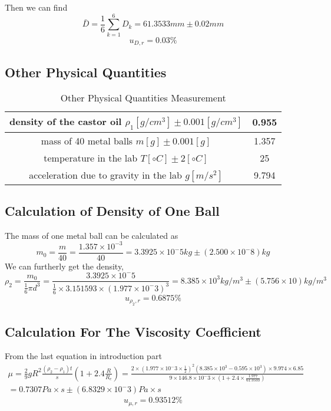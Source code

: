 Then we can find
$$  \bar{D} = \frac{1}{6} \sum_{k=1}^{6} D_k =  61.3533 mm \pm  0.02 mm   $$
$$  u_{D,r} =   0.03\%  $$ 


\subsection{Other Physical Quantities}

\begin{table}[H]
  \centering
  \begin{tabular}{|c|c|}
    \hline
    density of the castor oil $ \rho_1 [g/cm^3] \pm 0.001 [g/cm^3] $ & 0.955  \\ \hline 
    mass of 40 metal balls $ m  [g] \pm 0.001 [g] $ & 1.357 \\ \hline
    temperature in the lab $ T  [\circ C] \pm 2 [\circ C] $ & 25 \\ \hline
    acceleration due to gravity in the lab $ g [m/s^2] $ & 9.794 \\ \hline
  \end{tabular}
  \caption{Other Physical Quantities Measurement}
\end{table}

\subsection{Calculation of Density of One Ball}

The mass of one  metal ball can be calculated as
$$  m_0 = \frac{m}{40} = \frac{1.357 \times 10^{-3} }{40} = 3.3925 \times 10^-5 kg
\pm (2.500 \times 10^-8) kg $$ 
We can furtherly get the density,
$$ \rho_2 = \frac{m_0}{\frac{1}{6} \pi d^3} = \frac{3.3925 \times 10^-5
}{\frac{1}{6} \times 3.151593 \times (1.977 \times 10^-3)^3 } = 8.385 \times
10^3 kg/m^3 \pm (5.756 \times 10  ) kg/m^3  $$
$$  u_{\rho_2,r} =   0.6875\%  $$ 

\subsection{Calculation For The Viscosity Coefficient}
From the last equation in introduction part
\begin{multline*}
\mu = \frac{2}{9} g R^2 \frac{( \rho_2 - \rho_1 ) t  }{s} (1 + 2.4
\frac{R}{R_c})  =  \frac{2 \times (1.977 \times 10^-3 \times \frac{1}{2})^2
  (8.385\times 10^3 - 0.595 \times 10^3 ) \times 9.974 \times 6.85 }{9 \times
  146.8\times 10^-3 \times (1 + 2.4 \times \frac{1.977}{61.3533})} \\
 = 0.7307 Pa \times s \pm (6.8329 \times 10^-3 ) Pa \times s 
 \end{multline*}
$$  u_{\mu,r} =  0.93512 \%  $$ 

